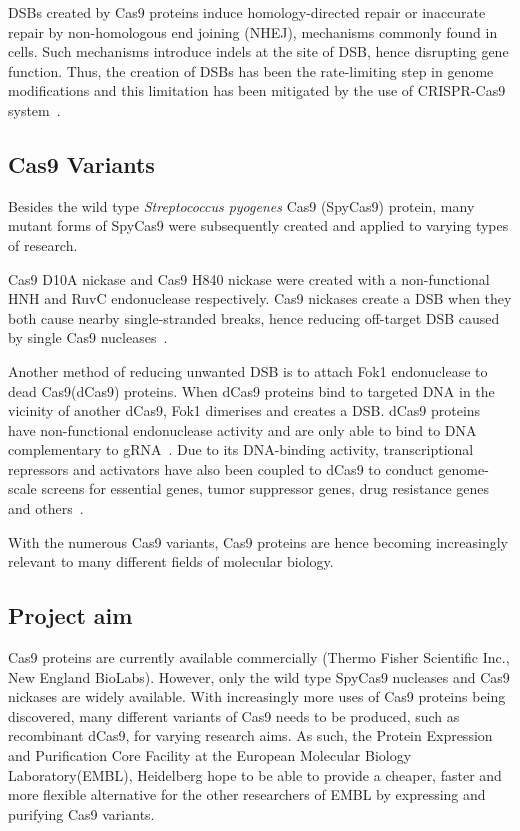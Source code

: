 \documentclass[11pt]{article}
\begin{document}
DSBs created by Cas9 proteins induce homology-directed repair or inaccurate repair by non-homologous end joining (NHEJ), mechanisms commonly found in cells. Such mechanisms introduce indels at the site of DSB, hence disrupting gene function. Thus, the creation of DSBs has been the rate-limiting step in genome modifications and this limitation has been mitigated by the use of CRISPR-Cas9 system~\citep{Chen2015a, Ramalingam2013}. 

\subsection{Cas9 Variants}
Besides the wild type \textit{Streptococcus pyogenes} Cas9 (SpyCas9) protein, many mutant forms of SpyCas9 were subsequently created and applied to varying types of research. 

Cas9 D10A nickase and Cas9 H840 nickase were created with a non-functional HNH and RuvC endonuclease respectively. Cas9 nickases create a DSB when they both cause nearby single-stranded breaks, hence reducing off-target DSB caused by single Cas9 nucleases~\citep{Ran2013}. 

Another method of reducing unwanted DSB is to attach Fok1 endonuclease to dead Cas9(dCas9) proteins. When dCas9 proteins bind to targeted DNA in the vicinity of another dCas9, Fok1 dimerises and creates a DSB. dCas9 proteins have non-functional endonuclease activity and are only able to bind to DNA complementary to gRNA~\citep{Guilinger2014c}. Due to its DNA-binding activity, transcriptional repressors and activators have also been coupled to dCas9 to conduct genome-scale screens for essential genes, tumor suppressor genes, drug resistance genes and others~\citep{Gilbert2014, Shalem2015}. 

With the numerous Cas9 variants, Cas9 proteins are hence becoming increasingly relevant to many different fields of molecular biology.

\subsection{Project aim}
Cas9 proteins are currently available commercially (Thermo Fisher Scientific Inc., New England BioLabs). However, only the wild type SpyCas9 nucleases and Cas9 nickases are widely available. With increasingly more uses of Cas9 proteins being discovered, many different variants of Cas9 needs to be produced, such as recombinant dCas9, for varying research aims. As such, the Protein Expression and Purification Core Facility at the European Molecular Biology Laboratory(EMBL), Heidelberg hope to be able to provide a cheaper, faster and more flexible alternative for the other researchers of EMBL by expressing and purifying Cas9 variants. 
\end{document}
